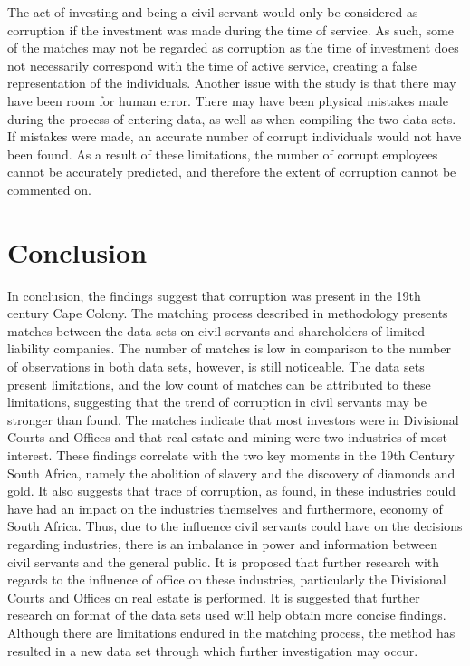 \documentclass[12pt,preprint, authoryear]{elsarticle}
\numberwithin{equation}{section}
\numberwithin{figure}{section}
\numberwithin{table}{section}
\begin{document}
The act of investing and being a civil servant would only be considered
as corruption if the investment was made during the time of service. As
such, some of the matches may not be regarded as corruption as the time
of investment does not necessarily correspond with the time of active
service, creating a false representation of the individuals. Another
issue with the study is that there may have been room for human error.
There may have been physical mistakes made during the process of
entering data, as well as when compiling the two data sets. If mistakes
were made, an accurate number of corrupt individuals would not have been
found. As a result of these limitations, the number of corrupt employees
cannot be accurately predicted, and therefore the extent of corruption
cannot be commented on.

\hypertarget{conclusion}{%
\section{Conclusion}\label{conclusion}}

In conclusion, the findings suggest that corruption was present in the
19th century Cape Colony. The matching process described in methodology
presents matches between the data sets on civil servants and
shareholders of limited liability companies. The number of matches is
low in comparison to the number of observations in both data sets,
however, is still noticeable. The data sets present limitations, and the
low count of matches can be attributed to these limitations, suggesting
that the trend of corruption in civil servants may be stronger than
found. The matches indicate that most investors were in Divisional
Courts and Offices and that real estate and mining were two industries
of most interest. These findings correlate with the two key moments in
the 19th Century South Africa, namely the abolition of slavery and the
discovery of diamonds and gold. It also suggests that trace of
corruption, as found, in these industries could have had an impact on
the industries themselves and furthermore, economy of South Africa.
Thus, due to the influence civil servants could have on the decisions
regarding industries, there is an imbalance in power and information
between civil servants and the general public. It is proposed that
further research with regards to the influence of office on these
industries, particularly the Divisional Courts and Offices on real
estate is performed. It is suggested that further research on format of
the data sets used will help obtain more concise findings. Although
there are limitations endured in the matching process, the method has
resulted in a new data set through which further investigation may
occur.
\end{document}
